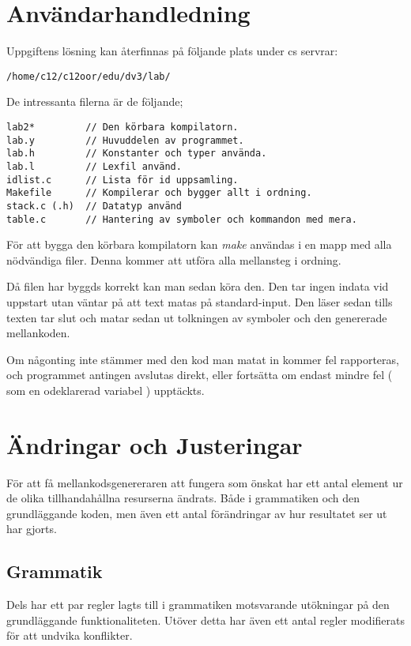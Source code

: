 \section{Användarhandledning}

	Uppgiftens lösning kan återfinnas på följande plats under cs servrar:
\begin{verbatim}
/home/c12/c12oor/edu/dv3/lab/
\end{verbatim}
	De intressanta filerna är de följande;
\begin{verbatim}
lab2*         // Den körbara kompilatorn.
lab.y         // Huvuddelen av programmet.
lab.h         // Konstanter och typer använda.
lab.l         // Lexfil använd.
idlist.c      // Lista för id uppsamling.
Makefile      // Kompilerar och bygger allt i ordning.
stack.c (.h)  // Datatyp använd
table.c       // Hantering av symboler och kommandon med mera.
\end{verbatim}

	För att bygga den körbara kompilatorn kan \textit{make} användas i en mapp med alla nödvändiga filer. Denna kommer att utföra alla mellansteg i ordning.
	
	Då filen har byggds korrekt kan man sedan köra den. Den tar ingen indata vid uppstart utan väntar på att text matas på standard-input. Den läser sedan tills texten tar slut och matar sedan ut tolkningen av symboler och den genererade mellankoden.	
	
	Om någonting inte stämmer med den kod man matat in kommer fel rapporteras, och programmet antingen avslutas direkt, eller fortsätta om endast mindre fel ( som en odeklarerad variabel ) upptäckts.

\pagebreak

\section{ Ändringar och Justeringar }
	För att få mellankodsgenereraren att fungera som önskat har ett antal 
	element ur de olika tillhandahållna resurserna ändrats. Både i grammatiken
	och den grundläggande koden, men även ett antal förändringar av hur
	resultatet ser ut har gjorts.

	\subsection{Grammatik}
		Dels har ett par regler lagts till i grammatiken motsvarande utökningar
		på den grundläggande funktionaliteten. Utöver detta har även ett antal regler 
		modifierats för att undvika konflikter.
		
